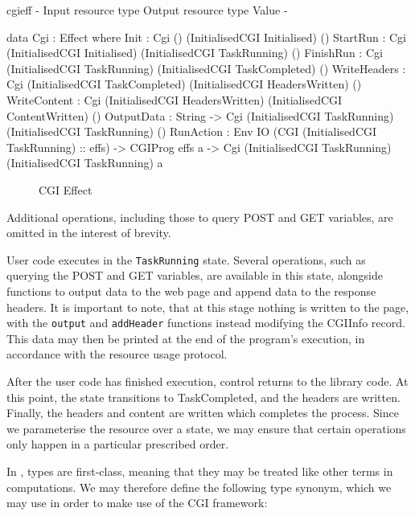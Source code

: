 \begin{SaveVerbatim}{cgieff}
{-                     { Input resource type }         { Output resource type }        { Value } -}

data Cgi : Effect where
    Init         : Cgi ()                              (InitialisedCGI Initialised)    ()
    StartRun     : Cgi (InitialisedCGI Initialised)    (InitialisedCGI TaskRunning)    ()
    FinishRun    : Cgi (InitialisedCGI TaskRunning)    (InitialisedCGI TaskCompleted)  ()
    WriteHeaders : Cgi (InitialisedCGI TaskCompleted)  (InitialisedCGI HeadersWritten) ()
    WriteContent : Cgi (InitialisedCGI HeadersWritten) (InitialisedCGI ContentWritten) ()
    OutputData   : String -> 
                   Cgi (InitialisedCGI TaskRunning)    (InitialisedCGI TaskRunning)    ()
    RunAction    : Env IO (CGI (InitialisedCGI TaskRunning) :: effs) -> CGIProg effs a -> 
                   Cgi (InitialisedCGI TaskRunning)    (InitialisedCGI TaskRunning)    a
\end{SaveVerbatim}

\begin{figure*}[t]
\begin{center}
\end{center}
\caption{CGI Effect}
\label{fig:cgieffect}
\end{figure*}

Additional operations, including those to query POST and GET variables, are
omitted in the interest of brevity.

User code executes in the \texttt{TaskRunning} state. Several operations, such
as querying the POST and GET variables, are available in this state, alongside
functions to output data to the web page and append data to the response
headers. It is important to note, that at this stage nothing is written to the
page, with the \texttt{output} and \texttt{addHeader} functions instead
modifying the CGIInfo record. This data may then be printed at the end of the
program's execution, in accordance with the resource usage protocol.

After the user code has finished execution, control returns to the library
code. At this point, the state transitions to TaskCompleted, and the headers
are written.  Finally, the headers and content are written which completes the
process. Since we parameterise the resource over a state, we may ensure that
certain operations only happen in a particular prescribed order.

In \idris{}, types are first-class, meaning that they may be treated like other
terms in computations. We may therefore define the following type synonym,
which we may use in order to make use of the CGI framework: 

